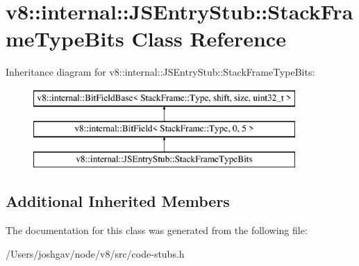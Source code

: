 \hypertarget{classv8_1_1internal_1_1_j_s_entry_stub_1_1_stack_frame_type_bits}{}\section{v8\+:\+:internal\+:\+:J\+S\+Entry\+Stub\+:\+:Stack\+Frame\+Type\+Bits Class Reference}
\label{classv8_1_1internal_1_1_j_s_entry_stub_1_1_stack_frame_type_bits}
Inheritance diagram for v8\+:\+:internal\+:\+:J\+S\+Entry\+Stub\+:\+:Stack\+Frame\+Type\+Bits\+:\begin{figure}[H]
\begin{center}
\leavevmode
\includegraphics[height=3.000000cm]{classv8_1_1internal_1_1_j_s_entry_stub_1_1_stack_frame_type_bits}
\end{center}
\end{figure}
\subsection*{Additional Inherited Members}


The documentation for this class was generated from the following file\+:\begin{DoxyCompactItemize}
\item 
/\+Users/joshgav/node/v8/src/code-\/stubs.\+h\end{DoxyCompactItemize}
